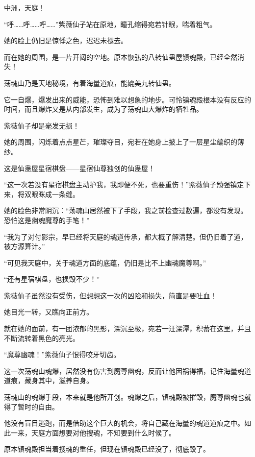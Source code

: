 
\begin{this_body}



中洲，天庭！

“呼……呼……呼……”紫薇仙子站在原地，瞳孔缩得宛若针眼，喘着粗气。

她的脸上仍旧是惊悸之色，迟迟未褪去。

而在她的周围，是一片开阔的空地。原本恢弘的八转仙蛊屋镇魂殿，已经全然消失！

荡魂山乃是天地秘境，有着海量道痕，能媲美九转仙蛊。

它一自爆，爆发出来的威能，恐怖到难以想象的地步。可怜镇魂殿根本没有反应的时间，而且爆炸又是从内部发生，成为了荡魂山大爆炸的牺牲品。

紫薇仙子却是毫发无损！

她的周围，闪烁着点点星芒，璀璨夺目，宛若在她身上披上了一层星尘编织的薄纱。

这是仙蛊屋星宿棋盘——星宿仙尊独创的仙蛊屋！

“这一次若没有星宿棋盘主动护我，我即便不死，也要重伤！”紫薇仙子勉强镇定下来，将双眼眯成一条缝。

她的脸色非常阴沉：“荡魂山居然被下了手段，我之前检查过数遍，都没有发现。恐怕这是幽魂魔尊的手笔！”

“我为了对付影宗，早已经将天庭的魂道传承，都大概了解清楚。但仍旧着了道，被方源算计。”

“可见我天庭中，关于魂道方面的底蕴，仍旧是比不上幽魂魔尊啊。”

“还有星宿棋盘，也损毁不少！”

紫薇仙子虽然没有受伤，但想想这一次的凶险和损失，简直是要吐血！

她目光一转，又瞧向正前方。

就在她的面前，有一团浓郁的黑影，深沉至极，宛若一汪深潭，积蓄在这里，并且不断流转着黑色的亮光。

“魔尊幽魂！”紫薇仙子恨得咬牙切齿。

这一次荡魂山魂爆，居然没有伤害到魔尊幽魂，反而让他因祸得福，记住海量魂道道痕，藏身其中，滋养自身。

荡魂山的魂爆手段，本来就是他所开创。魂爆之后，镇魂殿被摧毁，魔尊幽魂也就得了暂时的自由。

他没有盲目逃跑，而是借助这个巨大的机会，将自己藏在海量的魂道道痕之中。如此一来，天庭方面想要对他搜魂，不知要到什么时候了。

原本镇魂殿担当着搜魂的重任，但现在镇魂殿已经没了，彻底毁了。


\end{this_body}
